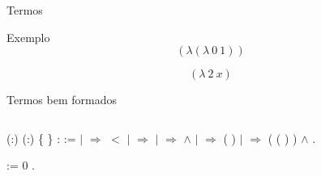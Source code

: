 \documentclass{beamer}
\begin{document}

\begin{frame}{Termos}

\begin{block}{Exemplo}
    \[ (\lambda (\lambda \ 0\ 1)) \] 
\end{block}
    \pause
\begin{alertblock}{}
    \[ (\lambda\ 2\ x)  \] 
    
\end{alertblock}


\end{frame}


\begin{frame}{Termos bem formados}

\begin{columns}[T]
\begin{column}{.48\textwidth}
\small{

\coqdocnoindent {} 
(:) (:)
\{ \} :  :=\coqdoceol
\coqdocindent{1.00em}    \coqdoceol
\coqdocindent{1.00em} \ensuremath{|}  
\ensuremath{\Rightarrow}  $<$ \coqdoceol
\coqdocindent{1.00em} \ensuremath{|}  
\ensuremath{\Rightarrow} \coqdoceol \coqdocindent{1.00em}
\ensuremath{|}   
\ensuremath{\Rightarrow}   
\ensuremath{\land}   \coqdoceol
\coqdocindent{1.00em} \ensuremath{|}  
\ensuremath{\Rightarrow}  ( )
\coqdoceol \coqdocindent{1.00em} \ensuremath{|}
   \ensuremath{\Rightarrow}
( ( ) )
\ensuremath{\land}   \coqdoceol
\coqdocindent{1.00em} .\coqdoceol

\coqdocemptyline
\coqdocnoindent{}   :=  0 .\coqdoceol

}

\end{column}


\end{columns}
\end{frame}
\end{document}
